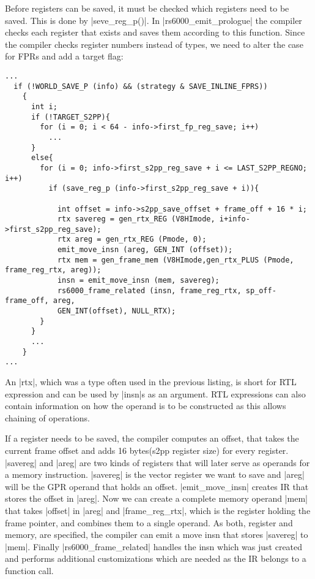 Before registers can be saved, it must be checked which registers need to be saved.
This is done by |seve_reg_p()|.
In |rs6000_emit_prologue| the compiler checks each register that exists and saves them according to this function.
Since the compiler checks register numbers instead of types, we need to alter the case for FPRs and add a target flag:
\begin{lstlisting}
...
  if (!WORLD_SAVE_P (info) && (strategy & SAVE_INLINE_FPRS))
    {
      int i;
      if (!TARGET_S2PP){
        for (i = 0; i < 64 - info->first_fp_reg_save; i++)
          ...
      }
      else{
        for (i = 0; info->first_s2pp_reg_save + i <= LAST_S2PP_REGNO; i++)
          if (save_reg_p (info->first_s2pp_reg_save + i)){

            int offset = info->s2pp_save_offset + frame_off + 16 * i;
            rtx savereg = gen_rtx_REG (V8HImode, i+info->first_s2pp_reg_save);
            rtx areg = gen_rtx_REG (Pmode, 0);
            emit_move_insn (areg, GEN_INT (offset));
            rtx mem = gen_frame_mem (V8HImode,gen_rtx_PLUS (Pmode, frame_reg_rtx, areg));
            insn = emit_move_insn (mem, savereg);
            rs6000_frame_related (insn, frame_reg_rtx, sp_off-frame_off, areg,
            GEN_INT(offset), NULL_RTX);
        }
      }
      ...
    }
...
\end{lstlisting}
An |rtx|, which was a type often used in the previous listing, is short for \ac{RTL} expression and can be used by |insn|s as an argument.
\ac{RTL} expressions can also contain information on how the operand is to be constructed as this allows chaining of operations.

If a register needs to be saved, the compiler computes an offset, that takes the current frame offset and adds 16 bytes(s2pp register size) for every register.
|savereg| and |areg| are two kinds of registers that will later serve as operands for a memory instruction.
|savereg| is the vector register we want to save and |areg| will be the GPR operand that holds an offset.
|emit_move_insn| creates IR that stores the offset in |areg|.
Now we can create a complete memory operand |mem| that takes |offset| in |areg| and |frame_reg_rtx|, which is the register holding the frame pointer, and combines them to a single operand.
As both, register and memory, are specified, the compiler can emit a move insn that stores |savereg| to |mem|.
Finally |rs6000_frame_related| handles the insn which was just created and performs additional customizations which are needed as the IR belongs to a function call.

